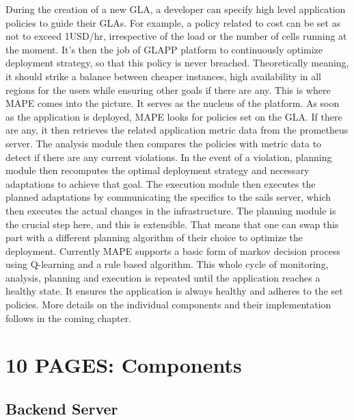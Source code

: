 \documentclass{seal_thesis}
\begin{document}
During the creation of a new GLA, a developer can specify high level application policies to guide their GLAs. 
For example, a policy related to cost can be set as not to exceed 1USD/hr, irrespective of the load or the number of cells running at the moment. 
It's then the job of GLAPP platform to continuously optimize deployment strategy, so that this policy is never breached. 
Theoretically meaning, it should strike a balance between cheaper instances, high availability in all regions for the users while ensuring other goals if there are any. 
This is where MAPE comes into the picture. 
It serves as the nucleus of the platform. 
As soon as the application is deployed, MAPE looks for policies set on the GLA. 
If there are any, it then retrieves the related application metric data from the prometheus server. 
The analysis module then compares the policies with metric data to detect if there are any current violations. 
In the event of a violation, planning module then recomputes the optimal deployment strategy and necessary adaptations to achieve that goal. 
The execution module then executes the planned adaptations by communicating the specifics to the sails server, which then executes the actual changes in the infrastructure. 
The planning module is the crucial step here, and this is extensible. 
That means that one can swap this part with a different planning algorithm of their choice to optimize the deployment. 
Currently MAPE supports a basic form of markov decision process using Q-learning and a rule based algorithm. 
This whole cycle of monitoring, analysis, planning and execution is repeated until the application reaches a healthy state. 
It ensures the application is always healthy and adheres to the set policies. 
More details on the individual components and their implementation follows in the coming chapter.


\chapter{10 PAGES: Components}\label{ch:components}

\section{Backend Server}
\end{document}

